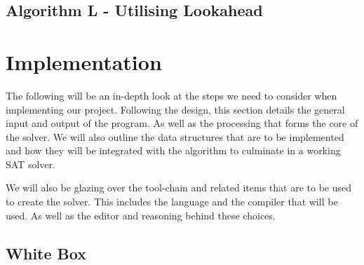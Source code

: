 \documentclass{article}
\begin{document}
\subsection{Algorithm L - Utilising Lookahead}
\lipsum[1-5]


\section{Implementation}

The following will be an in-depth look at the steps we need to consider when implementing our
project. Following the design, this section details the general input and output of the program. As
well as the processing that forms the core of the solver. We will also outline the data structures
that are to be implemented and how they will be integrated with the algorithm to culminate in a
working SAT solver.

We will also be glazing over the tool-chain and related items that are to be used to create the
solver. This includes the language and the compiler that will be used. As well as the editor and
reasoning behind these choices.

\subsection{White Box}
\end{document}
